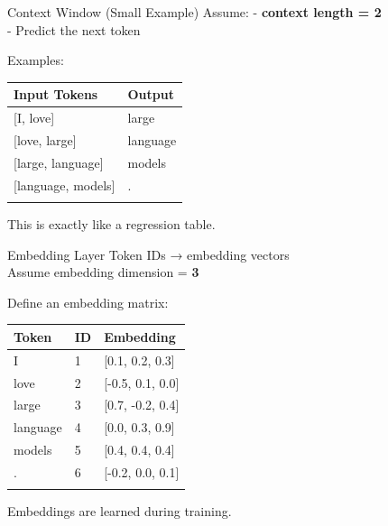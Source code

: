 \documentclass[
  ignorenonframetext,
]{beamer}
\begin{document}
\begin{frame}{Context Window (Small Example)}
\label{context-window-small-example}
Assume: - \textbf{context length = 2}\\
- Predict the next token

Examples:

\begin{longtable}[]{@{}ll@{}}
\toprule\noalign{}
Input Tokens & Output \\
\midrule\noalign{}
\endhead
{[}I, love{]} & large \\
{[}love, large{]} & language \\
{[}large, language{]} & models \\
{[}language, models{]} & . \\
\bottomrule\noalign{}
\end{longtable}

This is exactly like a regression table.
\end{frame}

\begin{frame}{Embedding Layer}
\label{embedding-layer}
Token IDs → embedding vectors\\
Assume embedding dimension = \textbf{3}

Define an embedding matrix:

\begin{longtable}[]{@{}lll@{}}
\toprule\noalign{}
Token & ID & Embedding \\
\midrule\noalign{}
\endhead
I & 1 & {[}0.1, 0.2, 0.3{]} \\
love & 2 & {[}-0.5, 0.1, 0.0{]} \\
large & 3 & {[}0.7, -0.2, 0.4{]} \\
language & 4 & {[}0.0, 0.3, 0.9{]} \\
models & 5 & {[}0.4, 0.4, 0.4{]} \\
. & 6 & {[}-0.2, 0.0, 0.1{]} \\
\bottomrule\noalign{}
\end{longtable}

Embeddings are learned during training.
\end{frame}
\end{document}
